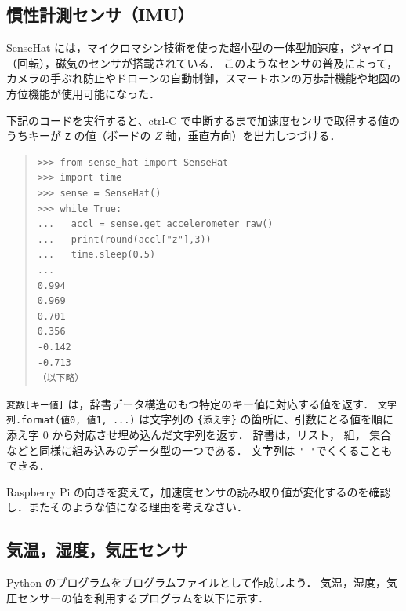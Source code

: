 \documentclass[11pt,a4,epsf]{report}
\begin{document}
\subsection{慣性計測センサ（IMU）}

SenseHat には，マイクロマシン技術を使った超小型の一体型加速度，ジャイロ（回転），磁気のセンサが搭載されている．
このようなセンサの普及によって，カメラの手ぶれ防止やドローンの自動制御，スマートホンの万歩計機能や地図の方位機能が使用可能になった．

下記のコードを実行すると、ctrl-C で中断するまで加速度センサで取得する値のうちキーが \verb+Z+ の値（ボードの $Z$ 軸，垂直方向）を出力しつづける．
\begin{quote}
\small
\begin{verbatim}
>>> from sense_hat import SenseHat 
>>> import time
>>> sense = SenseHat() 
>>> while True:
...   accl = sense.get_accelerometer_raw()
...   print(round(accl["z"],3))
...   time.sleep(0.5)
... 
0.994
0.969
0.701
0.356
-0.142
-0.713
（以下略）
\end{verbatim}
\end{quote}
\verb+変数[キー値]+ は，辞書データ構造のもつ特定のキー値に対応する値を返す．
\verb+文字列.format(値0, 値1, ...)+ は文字列の \verb+{添え字}+ の箇所に、引数にとる値を順に添え字 0 から対応させ埋め込んだ文字列を返す．
辞書は，リスト， 組， 集合などと同様に組み込みのデータ型の一つである．
文字列は \verb+' '+でくくることもできる．

\begin{excercise}
Raspberry Pi の向きを変えて，加速度センサの読み取り値が変化するのを確認し．またそのような値になる理由を考えなさい．
\end{excercise}

\subsection{気温，湿度，気圧センサ}

Python のプログラムをプログラムファイルとして作成しよう．
気温，湿度，気圧センサーの値を利用するプログラムを以下に示す．
\end{document}
